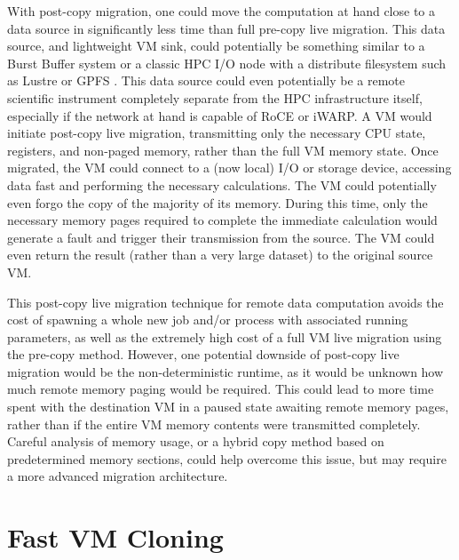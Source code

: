 With post-copy migration, one could move the computation at hand close to a data source in significantly less time than full pre-copy live migration. This data source, and lightweight VM sink, could potentially be something similar to a Burst Buffer system \cite{Lofstead2014,wright2015trinity} or a classic HPC I/O node with a distribute filesystem such as Lustre or GPFS \cite{schmuck2002gpfs}. This data source could even potentially be a remote scientific instrument completely separate from the HPC infrastructure itself, especially if the network at hand is capable of RoCE \cite{beck2011roce} or iWARP\cite{rashti200710}.  A VM would initiate post-copy live migration, transmitting  only the necessary CPU state, registers, and non-paged memory, rather than the full VM memory state. Once migrated, the VM could connect to a (now local) I/O or storage device, accessing data fast and performing the necessary calculations. The VM could potentially even forgo the copy of the majority of its memory. During this time, only the necessary memory pages required to complete the immediate calculation would generate a fault and trigger their transmission from the source.  The VM could even return the result (rather than a very large dataset) to the original source VM. 

This post-copy live migration technique for remote data computation avoids the cost of spawning a whole new job and/or process with associated running parameters, as well as the extremely high cost of a full VM live migration using the pre-copy method. However, one potential downside of post-copy live migration would be the non-deterministic runtime, as it would be unknown how much remote memory paging would be required. This could lead to more time spent with the destination VM in a paused state awaiting remote memory pages, rather than if the entire VM memory contents were transmitted completely. Careful analysis of memory usage, or a hybrid copy method based on predetermined memory sections, could help overcome this issue, but may require a more advanced migration architecture. 






\section{Fast VM Cloning}
\label{vmcloning}

